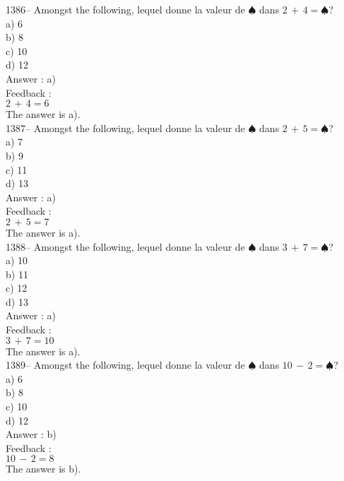 ﻿\documentclass[letterpaper, 12pt]{article}
\begin{document}
1386-- Amongst the following, lequel donne la valeur de
$\spadesuit$ dans $2\,+\,4=\spadesuit$?\\
a) 6\\
b) 8\\
c) 10\\
d) 12\\

Answer : a)\\

Feedback : \\
$2\,+\,4=6$\\
The answer is a).\\

1387-- Amongst the following, lequel donne la valeur de
$\spadesuit$ dans $2\,+\,5=\spadesuit$?\\
a) 7\\
b) 9\\
c) 11\\
d) 13\\

Answer : a)\\

Feedback : \\
$2\,+\,5=7$\\
The answer is a).\\

1388-- Amongst the following, lequel donne la valeur de
$\spadesuit$ dans $3\,+\,7=\spadesuit$?\\
a) 10\\
b) 11\\
c) 12\\
d) 13\\

Answer : a)\\

Feedback : \\
$3\,+\,7=10$\\
The answer is a).\\

1389-- Amongst the following, lequel donne la valeur de
$\spadesuit$ dans $10\,-\,2=\spadesuit$?\\
a) 6\\
b) 8\\
c) 10\\
d) 12\\

Answer : b)\\

Feedback : \\
$10\,-\,2=8$\\
The answer is b).\\
\end{document}
